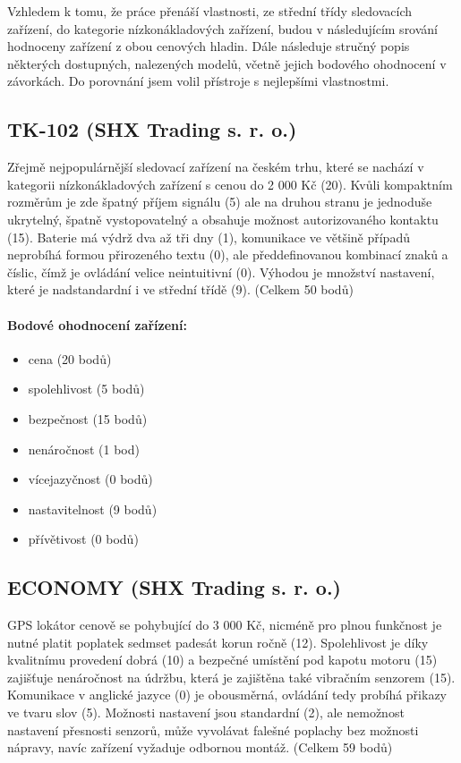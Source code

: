\documentclass[FM,BP]{tulthesis}  %
\begin{document}
Vzhledem k tomu, že práce přenáší vlastnosti, ze střední třídy sledovacích zařízení, do kategorie nízkonákladových zařízení, budou v následujícím srování hodnoceny zařízení z obou cenových hladin. Dále následuje stručný popis některých dostupných, nalezených modelů, včetně jejich bodového ohodnocení v závorkách. Do porovnání jsem volil přístroje s nejlepšími vlastnostmi.

\subsection{TK-102 (SHX Trading s. r. o.)}
Zřejmě nejpopulárnější sledovací zařízení na českém trhu, které se nachází v kategorii nízkonákladových zařízení s cenou do 2 000 Kč (20). Kvůli kompaktním rozměrům je zde špatný příjem signálu (5) ale na druhou stranu je jednoduše ukrytelný, špatně vystopovatelný a obsahuje možnost autorizovaného kontaktu (15). Baterie má výdrž dva až tři dny (1), komunikace ve většině případů neprobíhá formou přirozeného textu (0), ale předdefinovanou kombinací znaků a číslic, čímž je ovládání velice neintuitivní (0). Výhodou je množství nastavení, které je nadstandardní i ve střední třídě (9). (Celkem 50 bodů)

\paragraph{Bodové ohodnocení zařízení:}
\begin{itemize}
\item cena (20 bodů)
\item spolehlivost (5 bodů)
\item bezpečnost (15 bodů)
\item nenáročnost (1 bod)
\item vícejazyčnost (0 bodů)
\item nastavitelnost (9 bodů)
\item přívětivost (0 bodů)
\end{itemize}

\subsection{ECONOMY (SHX Trading s. r. o.)}
GPS lokátor cenově se pohybující do 3 000 Kč, nicméně pro plnou funkčnost je nutné platit poplatek sedmset padesát korun ročně (12). Spolehlivost je díky kvalitnímu provedení dobrá (10) a bezpečné umístění pod kapotu motoru (15) zajišťuje nenáročnost na údržbu, která je zajištěna také vibračním senzorem (15). Komunikace v anglické jazyce (0) je obousměrná, ovládání tedy probíhá přikazy ve tvaru slov (5). Možnosti nastavení jsou standardní (2), ale nemožnost nastavení přesnosti senzorů, může vyvolávat falešné poplachy bez možnosti nápravy, navíc zařízení vyžaduje odbornou montáž. (Celkem 59 bodů)
\end{document}
